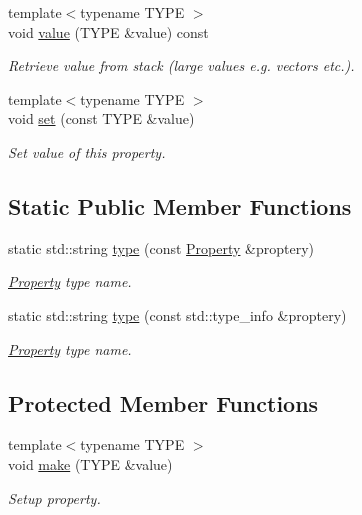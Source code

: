 \begin{DoxyCompactItemize}
{\footnotesize template$<$typename TYPE $>$ }\\void \hyperlink{class_d_d4hep_1_1_property_a0ad39ca9d70318555ad137780185e92d}{value} (TYPE \&value) const 
\begin{DoxyCompactList}\small\item\em Retrieve value from stack (large values e.g. vectors etc.). \item\end{DoxyCompactList}\item 
{\footnotesize template$<$typename TYPE $>$ }\\void \hyperlink{class_d_d4hep_1_1_property_a3f4ec149415ffae17a248fb03afd230f}{set} (const TYPE \&value)
\begin{DoxyCompactList}\small\item\em Set value of this property. \item\end{DoxyCompactList}\end{DoxyCompactItemize}
\subsection*{Static Public Member Functions}
\begin{DoxyCompactItemize}
\item 
static std::string \hyperlink{class_d_d4hep_1_1_property_a77de012a4b602cc74b395050128d289c}{type} (const \hyperlink{class_d_d4hep_1_1_property}{Property} \&proptery)
\begin{DoxyCompactList}\small\item\em \hyperlink{class_d_d4hep_1_1_property}{Property} type name. \item\end{DoxyCompactList}\item 
static std::string \hyperlink{class_d_d4hep_1_1_property_aeeb502311c3a963033cd82c82e2874d9}{type} (const std::type\_\-info \&proptery)
\begin{DoxyCompactList}\small\item\em \hyperlink{class_d_d4hep_1_1_property}{Property} type name. \item\end{DoxyCompactList}\end{DoxyCompactItemize}
\subsection*{Protected Member Functions}
\begin{DoxyCompactItemize}
\item 
{\footnotesize template$<$typename TYPE $>$ }\\void \hyperlink{class_d_d4hep_1_1_property_a7b18fa0adeb1c0a6e7f64affefe6d782}{make} (TYPE \&value)
\begin{DoxyCompactList}\small\item\em Setup property. \item\end{DoxyCompactList}\end{DoxyCompactItemize}
